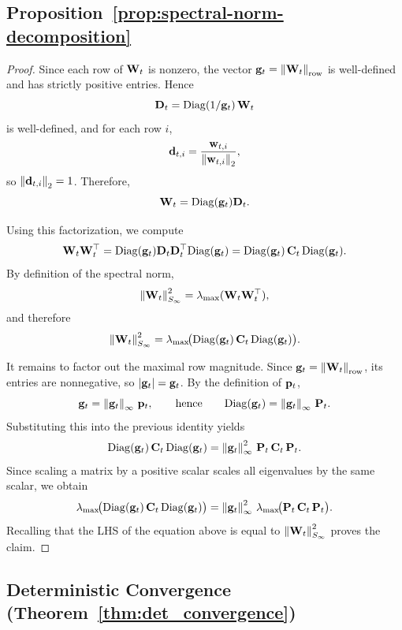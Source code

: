 
\subsection{Proposition~\texorpdfstring{\ref{prop:spectral-norm-decomposition}}{1}}
\label{ref:proof-spectral-norm-decomposition}

\begin{proof}
Since each row of $\mathbf{W}_t$ is nonzero, the vector $\mathbf{g}_t=\left \| \mathbf{W}_t \right\|_{\mathrm{row}}$ is well-defined and has strictly positive entries. Hence
$$
\mathbf{D}_t=\mathrm{Diag}\!\left(1/\mathbf{g}_t\right)\mathbf{W}_t
$$
is well-defined, and for each row $i$,
$$
\mathbf{d}_{t,i} = \frac{\mathbf{w}_{t,i}}{\left \| \mathbf{w}_{t,i} \right\|_2},
$$
so $\left \| \mathbf{d}_{t,i} \right\|_2=1$. Therefore,
$$
\mathbf{W}_t=\mathrm{Diag}(\mathbf{g}_t)\mathbf{D}_t.
$$

Using this factorization, we compute
$$
\mathbf{W}_t\mathbf{W}_t^\top
=
\mathrm{Diag}(\mathbf{g}_t)\mathbf{D}_t\mathbf{D}_t^\top\mathrm{Diag}(\mathbf{g}_t)
=
\mathrm{Diag}(\mathbf{g}_t)\,\mathbf{C}_t\,\mathrm{Diag}(\mathbf{g}_t).
$$
By definition of the spectral norm,
$$
\left \| \mathbf{W}_t \right\|_{S_\infty}^2
=
\lambda_{\max}(\mathbf{W}_t\mathbf{W}_t^\top),
$$
and therefore
$$
\left \| \mathbf{W}_t \right\|_{S_\infty}^2
=
\lambda_{\max}\!\bigl(\mathrm{Diag}(\mathbf{g}_t)\,\mathbf{C}_t\,\mathrm{Diag}(\mathbf{g}_t)\bigr).
$$

It remains to factor out the maximal row magnitude. Since $\mathbf{g}_t=\left \| \mathbf{W}_t \right\|_{\mathrm{row}}$, its entries are nonnegative, so $|\mathbf{g}_t|=\mathbf{g}_t$. By the definition of $\mathbf{p}_t$,
$$
\mathbf{g}_t=\left \| \mathbf{g}_t \right\|_\infty\,\mathbf{p}_t,
\qquad\text{hence}\qquad
\mathrm{Diag}(\mathbf{g}_t)=\left \| \mathbf{g}_t \right\|_\infty\,\mathbf{P}_t.
$$
Substituting this into the previous identity yields
$$
\mathrm{Diag}(\mathbf{g}_t)\,\mathbf{C}_t\,\mathrm{Diag}(\mathbf{g}_t)
=
\left \| \mathbf{g}_t \right\|_\infty^2\,\mathbf{P}_t\,\mathbf{C}_t\,\mathbf{P}_t.
$$
Since scaling a matrix by a positive scalar scales all eigenvalues by the same scalar, we obtain
$$
\lambda_{\max}\!\bigl(\mathrm{Diag}(\mathbf{g}_t)\,\mathbf{C}_t\,\mathrm{Diag}(\mathbf{g}_t)\bigr)
=
\left \| \mathbf{g}_t \right\|_\infty^2\,\lambda_{\max}\!\bigl(\mathbf{P}_t\,\mathbf{C}_t\,\mathbf{P}_t\bigr).
$$
Recalling that the LHS of the equation above is equal to $\left \| \mathbf{W}_t \right\|_{S_\infty}^2$ proves the claim.
\end{proof}

\subsection{Deterministic Convergence (Theorem~\texorpdfstring{\ref{thm:det_convergence}}{1})}
\label{sec:app.conv_analysis}
